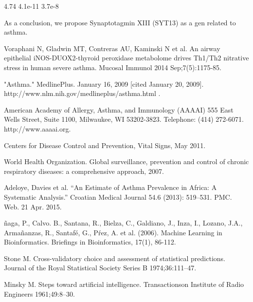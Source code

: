 \documentclass[conference,a4paper]{IEEEtran}
\begin{document}
4.74	4.1e-11	3.7e-8



As a conclusion, we propose Synaptotagmin XIII (SYT13) as a gen related to asthma. 

\begin{thebibliography}{1}
	
	 Voraphani N, Gladwin MT, Contreras AU, Kaminski N et al. An airway epithelial iNOS-DUOX2-thyroid peroxidase metabolome drives Th1/Th2 nitrative stress in human severe asthma. Mucosal Immunol 2014 Sep;7(5):1175-85.
	
	 "Asthma." MedlinePlus. January 16, 2009 [cited January 20, 2009]. http://www.nlm.nih.gov/medlineplus/asthma.html .
	
	 American Academy of Allergy, Asthma, and Immunology (AAAAI) 555 East Wells Street, Suite 1100, Milwaukee, WI 53202-3823. Telephone: (414) 272-6071. http://www.aaaai.org.
	
	 Centers for Disease Control and Prevention, Vital Signs, May 2011.
	
	 World Health Organization. Global surveillance, prevention and control of chronic respiratory diseases: a comprehensive approach, 2007.
	
	 Adeloye, Davies et al. “An Estimate of Asthma Prevalence in Africa: A Systematic Analysis.” Croatian Medical Journal 54.6 (2013): 519–531. PMC. Web. 21 Apr. 2015.
	
	\~naga, P., Calvo. B., Santana, R., Bielza, C., Galdiano, J., Inza, I., Lozano, J.A., Arma\~nanzas, R., Santaf\'e, G., P\'rez, A. et al. (2006). Machine Learning in Bioinformatics. Briefings in Bioinformatics, 17(1), 86-112.
	
	 Stone M. Cross-validatory choice and assessment of statistical predictions. Journal of the Royal Statistical Society Series B 1974;36:111–47.
	
	 Minsky M. Steps toward artificial intelligence. Transactionson Institute of Radio Engineers 1961;49:8–30.
	

\end{thebibliography}
\end{document}
